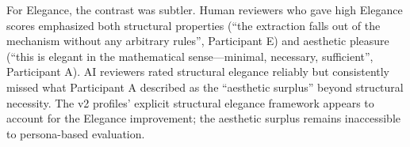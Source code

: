For Elegance, the contrast was subtler. Human reviewers who gave high Elegance scores emphasized both structural properties (``the extraction falls out of the mechanism without any arbitrary rules'', Participant E) and aesthetic pleasure (``this is elegant in the mathematical sense---minimal, necessary, sufficient'', Participant A). AI reviewers rated structural elegance reliably but consistently missed what Participant A described as the ``aesthetic surplus'' beyond structural necessity. The v2 profiles' explicit structural elegance framework appears to account for the Elegance improvement; the aesthetic surplus remains inaccessible to persona-based evaluation.
